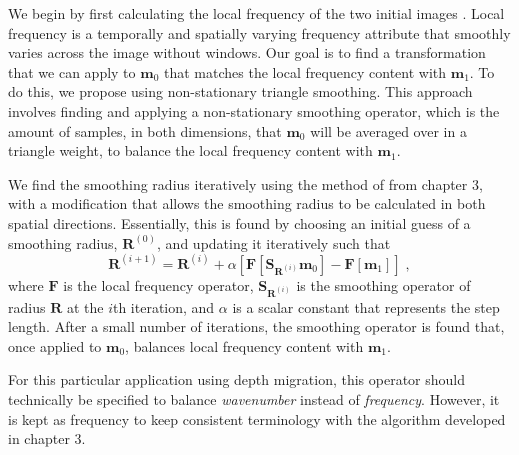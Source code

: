     We begin by first calculating the local frequency of the two initial images \cite[]{attr}. 
    Local frequency is a temporally and spatially varying frequency attribute that smoothly varies across the image without windows.
    Our goal is to find a transformation that we can apply to $\mathbf{m}_0$ that matches the local frequency content with $\mathbf{m}_1$. 
    To do this, we propose using non-stationary triangle smoothing. 
    This approach involves finding and applying a non-stationary smoothing operator, which is the amount of samples, in both dimensions, that $\mathbf{m}_0$ will be averaged over in a triangle weight, to balance the local frequency content with $\mathbf{m}_1$. 
    
    We find the smoothing radius iteratively using the method of \cite{locfreq} from chapter 3, with a modification that allows the smoothing radius to be calculated in both spatial directions. 
Essentially, this is found by choosing an initial guess of a smoothing radius, $\mathbf{R}^{(0)}$, and updating it iteratively such that 
    \begin{equation}
        \label{eq:it}
        \mathbf{R}^{(i+1)} = \mathbf{R}^{(i)}+ \alpha \left [ \mathbf{F}[\mathbf{S}_{\mathbf{R}^{(i)}} \mathbf{m}_0] - \mathbf{F}[\mathbf{m}_1] \right ]\;,
    \end{equation}
    where $\mathbf{F}$ is the local frequency operator, $\mathbf{S}_{\mathbf{R}^{(i)}}$ is the smoothing operator of radius $\mathbf{R}$ at the $i$th iteration, and $\alpha$ is a scalar constant that represents the step length.
    After a small number of iterations, the smoothing operator is found that, once applied to $\mathbf{m}_0$, balances local frequency content with $\mathbf{m}_1$.

    For this particular application using depth migration, this operator should technically be specified to balance {\em wavenumber} instead of {\em frequency}.
    However, it is kept as frequency to keep consistent terminology with the algorithm developed in chapter 3.


